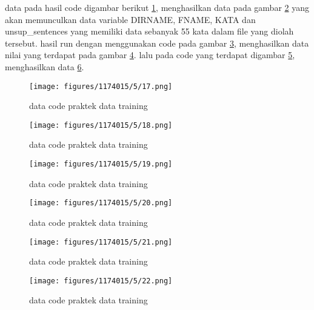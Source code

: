 \begin{enumerate}
        data pada hasil code digambar berikut \ref{l1}, menghasilkan data pada gambar \ref{l2} yang akan memunculkan data variable DIRNAME, FNAME, KATA dan unsup\_sentences yang memiliki data sebanyak 55 kata dalam file yang diolah tersebut. hasil run dengan menggunakan code pada gambar \ref{l3}, menghasilkan data nilai yang terdapat pada gambar \ref{l4}. lalu pada code yang terdapat digambar \ref{l5}, menghasilkan data \ref{l6}.
        \begin{figure}[H]
            \texttt{[image: figures/1174015/5/17.png]}
            \centering
            \caption{data code praktek data training }
            \label{l1}
        \end{figure}
        \begin{figure}[H]
            \texttt{[image: figures/1174015/5/18.png]}
            \centering
            \caption{data code praktek data training }
            \label{l2}
        \end{figure}
        \begin{figure}[H]
            \texttt{[image: figures/1174015/5/19.png]}
            \centering
            \caption{data code praktek data training }
            \label{l3}
        \end{figure}
        \begin{figure}[H]
            \texttt{[image: figures/1174015/5/20.png]}
            \centering
            \caption{data code praktek data training }
            \label{l4}
        \end{figure}
        \begin{figure}[H]
            \texttt{[image: figures/1174015/5/21.png]}
            \centering
            \caption{data code praktek data training }
            \label{l5}
        \end{figure}
        \begin{figure}[H]
            \texttt{[image: figures/1174015/5/22.png]}
            \centering
            \caption{data code praktek data training }
            \label{l6}
        \end{figure}
        

\end{enumerate}

